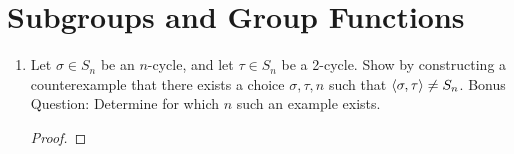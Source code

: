 \documentclass[../psets.tex]{subfiles}
\begin{document}
\section{Subgroups and Group Functions}
\begin{enumerate}
    \item {}Let $\sigma\in S_n$ be an $n$-cycle, and let $\tau\in S_n$ be a 2-cycle. Show by constructing a counterexample that there exists a choice $\sigma,\tau,n$ such that $\left\langle{\sigma,\tau}\right\rangle\neq S_n$. Bonus Question: Determine for which $n$ such an example exists.
    \begin{proof}









\end{proof}
\end{enumerate}
\end{document}
